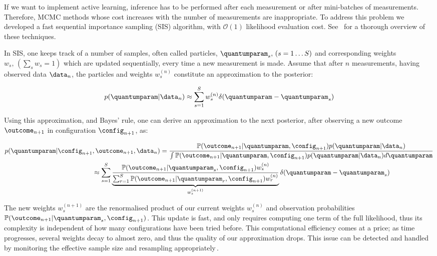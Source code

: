 If we want to implement active learning, inference has to be performed after each measurement or after mini-batches of measurements. Therefore, MCMC methods whose cost increases with the number of measurements are inappropriate. To address this problem we developed a fast sequential importance sampling (SIS) algorithm, with $\mathcal{O}(1)$ likelihood evaluation cost. See \,\citep{SMCBook} for a thorough overview of these techniques.

In SIS, one keeps track of a number of samples, often called particles, $\quantumparam_s,\, (s=1\ldots S)$ and corresponding weights $w_s, \, \left( \sum_s w_s = 1 \right)$  which are updated sequentially, every time a new measurement is made. Assume that after $n$ measurements, having observed data $\data_n$, the particles and weights  $w^{(n)}_s$ constitute an approximation to the posterior:	

\begin{equation}
	p(\quantumparam\vert\data_n)\approx \sum_{s=1}^{S}w^{(n)}_s\delta(\quantumparam-\quantumparam_s)\label{eqn:SISapprox}
\end{equation}

Using this approximation, and Bayes' rule, one can derive an approximation to the next posterior, after observing a new outcome $\outcome_{n+1}$ in configuration $\config_{n+1}$, as:

\begin{align}
	p(\quantumparam\vert\config_{n+1}&,\outcome_{n+1},\data_n) = \frac{\mathbb{P}(\outcome_{n+1}\vert\quantumparam,\config_{n+1})p(\quantumparam\vert\data_n)}{\int \mathbb{P}(\outcome_{n+1}\vert\quantumparam,\config_{n+1})p(\quantumparam\vert\data_n) d\quantumparam}\label{eqn:SISupdate}\\
	&\approx \sum_{s=1}^{S}\underbrace{\frac{\mathbb{P}(\outcome_{n+1}\vert\quantumparam_s,\config_{n+1})w^{(n)}_s}{\sum_{r=1}^{S}\mathbb{P}(\outcome_{n+1}\vert\quantumparam_r,\config_{n+1})w^{(n)}_r}}_{w^{(n+1)}_s}\delta(\quantumparam-\quantumparam_s)\notag
\end{align}

The new weights $w^{(n+1)}_s$ are the renormalised product of our current weights $w^{(n)}_s$ and observation probabilities $\mathbb{P}(\outcome_{n+1}\vert\quantumparam_s,\config_{n+1})$. This update is fast, and only requires computing one term of the full likelihood, thus its complexity is independent of how many configurations have been tried before. This computational efficiency comes at a price; as time progresses, several weights decay to almost zero, and thus the quality of our approximation drops. This issue can be detected and handled by monitoring the effective sample size and resampling appropriately\,\citep{SMCBook}.

